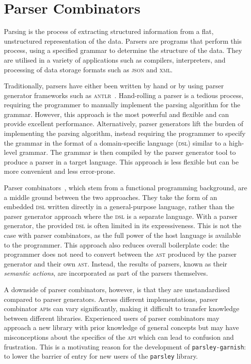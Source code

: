 \documentclass[../../main.tex]{subfiles}
\begin{document}
\section{Parser Combinators}

Parsing is the process of extracting structured information from a flat, unstructured representation of the data.
Parsers are programs that perform this process, using a specified grammar to determine the structure of the data.
They are utilised in a variety of applications such as compilers, interpreters, and processing of data storage formats such as \textsc{json} and \textsc{xml}.

Traditionally, parsers have either been written by hand or by using parser generator frameworks such as \textsc{antlr}~\cite{parr_antlr_2013}.
Hand-rolling a parser is a tedious process, requiring the programmer to manually implement the parsing algorithm for the grammar.
However, this approach is the most powerful and flexible and can provide excellent performance.
Alternatively, parser generators lift the burden of implementing the parsing algorithm, instead requiring the programmer to specify the grammar in the format of a domain-specific language (\textsc{dsl}) similar to a high-level grammar.
The grammar is then compiled by the parser generator tool to produce a parser in a target language.
This approach is less flexible but can be more convenient and less error-prone.

Parser combinators~\cite{hutton_higher-order_1992}, which stem from a functional programming background, are a middle ground between the two approaches.
They take the form of an embedded \textsc{dsl} written directly in a general-purpose language, rather than the parser generator approach where the \textsc{dsl} is a separate language.
With a parser generator, the provided \textsc{dsl} is often limited in its expressiveness.
This is not the case with parser combinators, as the full power of the host language is available to the programmer.
This approach also reduces overall boilerplate code: the programmer does not need to convert between the \textsc{ast} produced by the parser generator and their own \textsc{ast}.
Instead, the results of parsers, known as their \emph{semantic actions}, are incorporated as part of the parsers themselves.

A downside of parser combinators, however, is that they are unstandardised compared to parser generators.
Across different implementations, parser combinator \textsc{api}s can vary significantly, making it difficult to transfer knowledge between different libraries.
Experienced users of parser combinators may approach a new library with prior knowledge of general concepts but may have misconceptions about the specifics of the \textsc{api} which can lead to confusion and frustration.
This is a motivating reason for the development of \texttt{parsley-garnish}: to lower the barrier of entry for new users of the \texttt{parsley} library.
\end{document}
